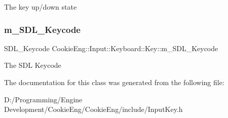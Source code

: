 The key up/down state \mbox{\label{class_cookie_eng_1_1_input_1_1_keyboard_1_1_key_afe0710d351e77160764ca176a13ead32}} 
\subsubsection{\texorpdfstring{m\+\_\+\+S\+D\+L\+\_\+\+Keycode}{m\_SDL\_Keycode}}
{\footnotesize\ttfamily S\+D\+L\+\_\+\+Keycode Cookie\+Eng\+::\+Input\+::\+Keyboard\+::\+Key\+::m\+\_\+\+S\+D\+L\+\_\+\+Keycode\hspace{0.3cm}{\ttfamily [protected]}}

The S\+DL Keycode 

The documentation for this class was generated from the following file\+:\begin{DoxyCompactItemize}
\item 
D\+:/\+Programming/\+Engine Development/\+Cookie\+Eng/\+Cookie\+Eng/include/Input\+Key.\+h\end{DoxyCompactItemize}
